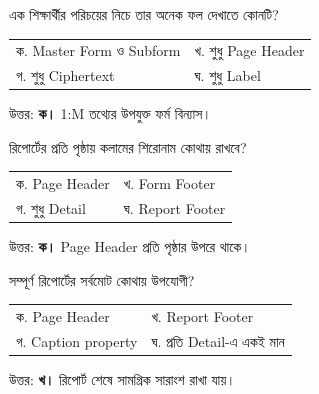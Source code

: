 \item \begin{minipage}[t]{\linewidth}
এক শিক্ষার্থীর পরিচয়ের নিচে তার অনেক ফল দেখাতে কোনটি?
\par
\begin{tabularx}{\linewidth}{@{}X X@{}}
ক. Master Form ও Subform & খ. শুধু Page Header \\
গ. শুধু Ciphertext & ঘ. শুধু Label \\
\end{tabularx}
\end{minipage}

\par উত্তর: \textbf{ক।} 1:M তথ্যের উপযুক্ত ফর্ম বিন্যাস।


\item \begin{minipage}[t]{\linewidth}
রিপোর্টের প্রতি পৃষ্ঠায় কলামের শিরোনাম কোথায় রাখবে?
\par
\begin{tabularx}{\linewidth}{@{}X X@{}}
ক. Page Header & খ. Form Footer \\
গ. শুধু Detail & ঘ. Report Footer \\
\end{tabularx}
\end{minipage}

\par উত্তর: \textbf{ক।} Page Header প্রতি পৃষ্ঠার উপরে থাকে।


\item \begin{minipage}[t]{\linewidth}
সম্পূর্ণ রিপোর্টের সর্বমোট কোথায় উপযোগী?
\par
\begin{tabularx}{\linewidth}{@{}X X@{}}
ক. Page Header & খ. Report Footer \\
গ. Caption property & ঘ. প্রতি Detail-এ একই মান \\
\end{tabularx}
\end{minipage}

\par উত্তর: \textbf{খ।} রিপোর্ট শেষে সামগ্রিক সারাংশ রাখা যায়।

